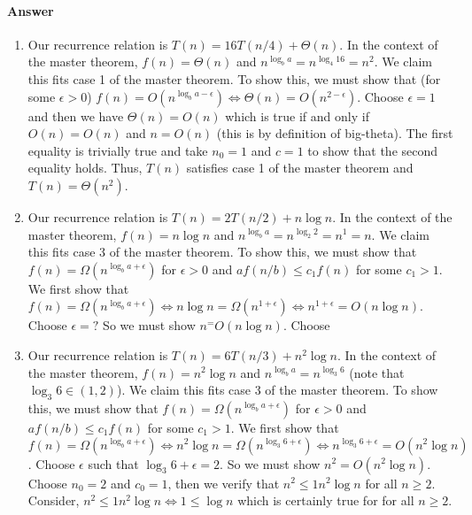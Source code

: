 \documentclass{article}
\begin{document}
\paragraph{Answer}


\begin{enumerate}
    \item Our recurrence relation is $T(n) = 16T(n/4) + \Theta (n)$.
    In the context of the master theorem, $f(n) = \Theta (n)$ and $n^{\log_b a} = n^{\log_4 16} = n^2$.
    We claim this fits case 1 of the master theorem.
    To show this, we must show that (for some $\epsilon > 0$) $f(n) = O(n^{\log_b a - \epsilon}) \iff \Theta (n) = O(n^{2 - \epsilon})$. \parspace
    Choose $\epsilon = 1$ and then we have $\Theta (n) = O(n)$ which is true if and only if $O(n) = O(n)$ and $n = O(n)$ (this is by definition of big-theta).
    The first equality is trivially true and take $n_0 = 1$ and $c = 1$ to show that the second equality holds. \parspace
    Thus, $T(n)$ satisfies case 1 of the master theorem and $T(n) = \Theta (n^2)$.
    \item Our recurrence relation is $T(n) = 2T(n/2) + n \log n$.
    In the context of the master theorem, $f(n) = n \log n$ and $n^{\log_b a} = n^{\log_2 2} = n^1 = n$.
    We claim this fits case 3 of the master theorem.
    To show this, we must show that $f(n) = \Omega (n^{\log_b a + \epsilon})$ for $\epsilon > 0$ and $a f(n/b) \leq c_1 f(n)$ for some $c_1 > 1$. \parspace
    We first show that $f(n) = \Omega (n^{\log_b a + \epsilon}) \iff n \log n = \Omega (n^{1 + \epsilon}) \iff n^{1 + \epsilon} = O(n \log n)$.
    Choose $\epsilon = ?$
    So we must show $n^ = O(n \log n)$.
    Choose
    \item Our recurrence relation is $T(n) = 6T(n/3) + n^2 \log n$.
    In the context of the master theorem, $f(n) = n^2 \log n$ and $n^{\log_b a} = n^{\log_3 6}$ (note that $\log_3 6 \in (1,2)$).
    We claim this fits case 3 of the master theorem.
    To show this, we must show that $f(n) = \Omega (n^{\log_b a + \epsilon})$ for $\epsilon > 0$ and $a f(n/b) \leq c_1 f(n)$ for some $c_1 > 1$. \parspace
    We first show that $f(n) = \Omega (n^{\log_b a + \epsilon}) \iff n^2 \log n = \Omega (n^{\log_3 6 + \epsilon}) \iff n^{\log_3 6 + \epsilon} = O(n^2 \log n)$.
    Choose $\epsilon$ such that $\log_3 6 + \epsilon = 2$.
    So we must show $n^2 = O(n^2 \log n)$.
    Choose $n_0 = 2$ and $c_0 = 1$, then we verify that $n^2 \leq 1 n^2 \log n$ for all $n \geq 2$.
    Consider, $ n^2 \leq 1 n^2 \log n \iff 1 \leq \log n $ which is certainly true for for all $n \geq 2$. \parspace

\end{enumerate}
\end{document}
